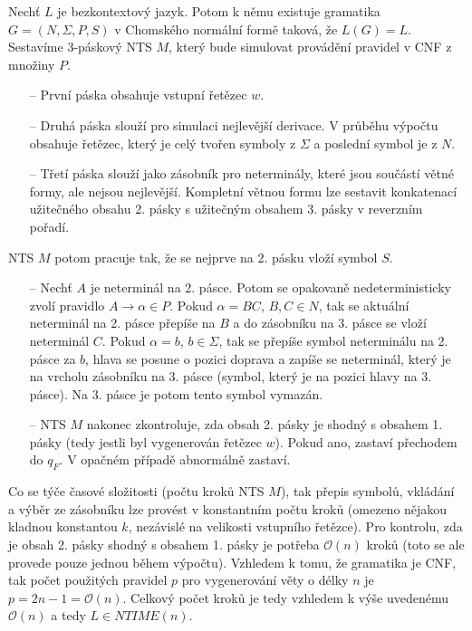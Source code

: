 \documentclass[a4paper,12pt]{article}
\begin{document}
\begin{enumerate}[label=\textbf{\arabic*}.]
 Nechť $L$ je bezkontextový jazyk. Potom k němu existuje gramatika $G = (N, \Sigma, P, S)$ v Chomského normální formě taková, že 
 $L(G) = L$. Sestavíme 3-páskový NTS $M$, který bude simulovat provádění pravidel v CNF z množiny $P$.
 \begin{itemize}
  \item[--] První páska obsahuje vstupní řetězec $w$.
  \item[--] Druhá páska slouží pro simulaci nejlevější derivace. V průběhu výpočtu obsahuje řetězec, který je celý 
  tvořen symboly z $\Sigma$ a poslední symbol je z $N$.
  \item[--] Třetí páska slouží jako zásobník pro neterminály, které jsou součástí větné formy, ale nejsou nejlevější. Kompletní větnou formu 
  lze sestavit konkatenací užitečného obsahu 2. pásky s užitečným obsahem 3. pásky v reverzním pořadí.
\end{itemize}
NTS $M$ potom pracuje tak, že se nejprve na 2. pásku vloží symbol $S$.
\begin{itemize}
  \item[--] Nechť $A$ je neterminál na 2. pásce. Potom se opakovaně nedeterministicky zvolí pravidlo $A\rightarrow \alpha \in P$.
  Pokud $\alpha = BC$, $B, C \in N$, tak se aktuální neterminál na 2. pásce přepíše na $B$ a do zásobníku na 3. pásce se vloží neterminál $C$.
  Pokud $\alpha = b$, $b\in\Sigma$, tak se přepíše symbol neterminálu na 2. pásce za $b$, hlava se posune o pozici doprava a zapíše se neterminál, 
  který je na vrcholu zásobníku na 3. pásce (symbol, který je na pozici hlavy na 3. pásce). Na 3. pásce je potom tento symbol vymazán.
  \item[--] NTS $M$ nakonec zkontroluje, zda obsah 2. pásky je shodný s obsahem 1. pásky (tedy jestli byl vygenerován řetězec $w$). Pokud ano, zastaví
  přechodem do $q_F$. V opačném případě abnormálně zastaví.
 \end{itemize}

 Co se týče časové složitosti (počtu kroků NTS $M$), tak přepis symbolů, vkládání a 
 výběr ze zásobníku lze provést v konstantním počtu kroků (omezeno nějakou kladnou konstantou $k$, 
 nezávislé na velikosti vstupního řetězce). Pro kontrolu, zda je obsah 2. pásky
 shodný s obsahem 1. pásky je potřeba $\mathcal{O}(n)$ kroků (toto se ale provede pouze jednou během výpočtu). Vzhledem k 
 tomu, že gramatika je CNF, tak počet použitých pravidel $p$ pro vygenerování věty o délky $n$ je $p = 2n - 1 = \mathcal{O}(n)$.
 Celkový počet kroků je tedy vzhledem k výše uvedenému $\mathcal{O}(n)$ a tedy $L\in NTIME(n)$.
 

\end{enumerate}
\end{document}
